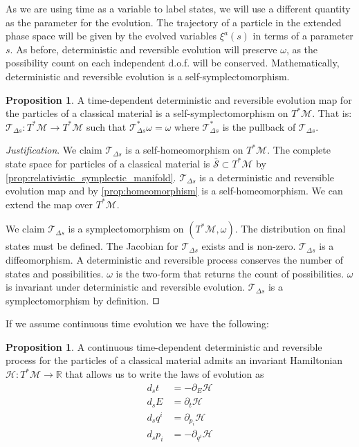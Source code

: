 \documentclass[smallextended]{svjour3}
\numberwithin{equation}{section}
\newenvironment{justification}{\emph{Justification}.}{\hfill\(\qed\)}
\theoremstyle{definition}
\newtheorem{prop}[equation]{Proposition}
\newenvironment{justification}{\emph{Justification}.}{\qed}
\begin{document}
As we are using time as a variable to label states, we will use a different quantity as the parameter for the evolution. The trajectory of a particle in the extended phase space will be given by the evolved variables $\xi^a(s)$ in terms of a parameter $s$. As before, deterministic and reversible evolution will preserve $\omega$, as the possibility count on each independent d.o.f. will be conserved. Mathematically, deterministic and reversible evolution is a self-symplectomorphism.

\begin{prop}\label{prop:relativistic_symplectomorphism}
	A time-dependent deterministic and reversible evolution map for the particles of a classical material is a self-symplectomorphism on $T^*\mathcal{M}$. That is: $\mathcal{T}_{\Delta s}: T^*\mathcal{M} \rightarrow T^*\mathcal{M}$ such that $\mathcal{T}_{\Delta s}^*\omega = \omega$ where $\mathcal{T}_{\Delta s}^*$ is the pullback of $\mathcal{T}_{\Delta s}$.
\end{prop}

\begin{justification}
	We claim $\mathcal{T}_{\Delta s}$ is a self-homeomorphism on $T^*\mathcal{M}$. The complete state space for particles of a classical material is $\bar{\mathcal{S}} \subset T^*\mathcal{M}$ by \ref{prop:relativistic_symplectic_manifold}. $\mathcal{T}_{\Delta s}$ is a deterministic and reversible evolution map and by \ref{prop:homeomorphism} is a self-homeomorphism. We can extend the map over $T^*\mathcal{M}$.
	
	We claim $\mathcal{T}_{\Delta s}$ is a symplectomorphism on $(T^*\mathcal{M}, \omega)$. The distribution on final states must be defined. The Jacobian for $\mathcal{T}_{\Delta s}$ exists and is non-zero. $\mathcal{T}_{\Delta s}$ is a diffeomorphism. A deterministic and reversible process conserves the number of states and possibilities. $\omega$ is the two-form that returns the count of possibilities. $\omega$ is invariant under deterministic and reversible evolution. $\mathcal{T}_{\Delta s}$ is a symplectomorphism by definition.
\end{justification}

If we assume continuous time evolution we have the following:

\begin{prop}\label{prop:relativistic_hamiltons_equations}
	A continuous time-dependent deterministic and reversible process for the particles of a classical material admits an invariant Hamiltonian $\mathcal{H}: T^*\mathcal{M} \rightarrow \mathbb{R}$ that allows us to write the laws of evolution as
	\begin{align*}
	d_{s}t &= - \partial_{E} \mathcal{H} \\
	d_{s}E &= \partial_{t} \mathcal{H} \\
	d_{s}q^i &= \partial_{p_i} \mathcal{H} \\
	d_{s}p_i &= - \partial_{q^i} \mathcal{H}
	\end{align*}
\end{prop}
\end{document}
